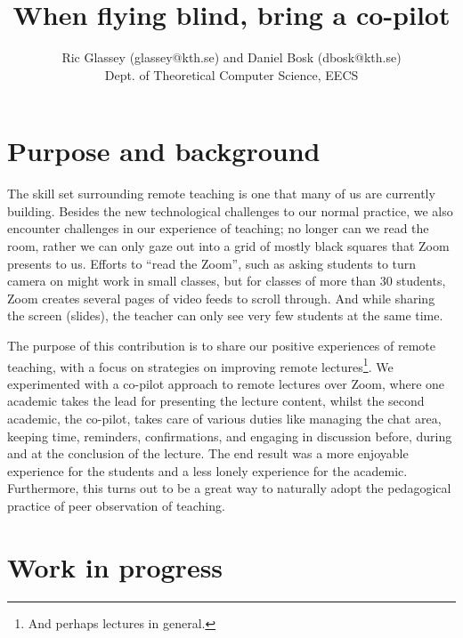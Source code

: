 \documentclass{article}
\title{When flying blind, bring a co-pilot}
\author{Ric Glassey (glassey@kth.se) and Daniel Bosk (dbosk@kth.se)\\
Dept. of Theoretical Computer Science, EECS
}
\date{}
\begin{document}
\maketitle



\section*{Purpose and background}

The skill set surrounding remote teaching is one that many of us are currently 
building. Besides the new technological challenges to our normal practice, we 
also encounter challenges in our experience of teaching; no longer can we read 
the room, rather we can only gaze out into a grid of mostly black squares that 
Zoom presents to us.
Efforts to \enquote{read the Zoom}, such as asking students to turn camera on 
might work in small classes, but for classes of more than 30 students, Zoom 
creates several pages of video feeds to scroll through.
And while sharing the screen (\eg slides), the teacher can only see very few 
students at the same time.

The purpose of this contribution is to share our positive experiences of remote 
teaching, with a focus on strategies on improving remote lectures\footnote{%
  And perhaps lectures in general.
}.
We experimented with a co-pilot approach to remote lectures over Zoom, where 
one academic takes the lead for presenting the lecture content, whilst the 
second academic, the co-pilot, takes care of various duties like managing the 
chat area, keeping time, reminders, confirmations, and engaging in discussion 
before, during and at the conclusion of the lecture.
The end result was a more enjoyable experience for the students and a less 
lonely experience for the academic.
Furthermore, this turns out to be a great way to naturally adopt the 
pedagogical practice of peer observation of teaching.


\section*{Work in progress}
\end{document}

